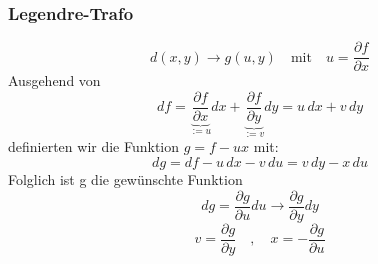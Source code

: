 \documentclass[titlepage,12pt,a4paper,ngerman]{report}
\newcommand{\tx}[1]{\textrm{#1}}
\newcommand{\ub}[1]{\underbrace{#1}}
\begin{document}
\subsubsection{Legendre-Trafo}
\begin{equation*}
d(x,y) \rightarrow g(u,y) \quad \tx{mit} \quad u = \frac{\partial f}{\partial x} \tag{2}
\end{equation*}
Ausgehend von
\begin{equation*}
df = \ub{\frac{\partial f}{\partial x}}_{:= u} dx + \ub{\frac{\partial f}{\partial y}}_{:= v} dy = u \, dx + v \, dy
\end{equation*}
definierten wir die Funktion $ g = f - ux $ mit:
\begin{equation*}
dg = df - u\, dx  - v\, du = v \, dy - x \, du \tag{3}
\end{equation*}
Folglich ist g die gewünschte Funktion
\begin{equation*}
dg = \frac{\partial g}{\partial u} du \rightarrow \frac{\partial g}{\partial y} dy \tag{4}
\end{equation*}
\begin{equation*}
v = \frac{\partial g}{\partial y} \quad , \quad x = -\frac{\partial g}{\partial u}
\end{equation*}

\end{document}
